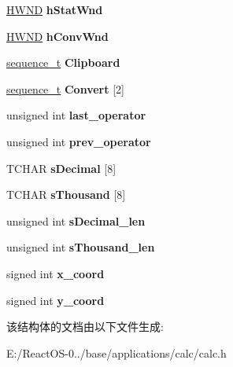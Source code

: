 \begin{DoxyCompactItemize}
\mbox{\label{structcalc__t_ad9746f134105e397276abf40e8cb08a5}} 
\hyperlink{interfacevoid}{H\+W\+ND} {\bfseries h\+Stat\+Wnd}
\item 
\mbox{\label{structcalc__t_aeb227fb85d7af8505466cda7e77a2498}} 
\hyperlink{interfacevoid}{H\+W\+ND} {\bfseries h\+Conv\+Wnd}
\item 
\mbox{\label{structcalc__t_ab4711c702f48f3d140c82bb906680266}} 
\hyperlink{structsequence__t}{sequence\+\_\+t} {\bfseries Clipboard}
\item 
\mbox{\label{structcalc__t_a133a1d537213baa5f1698bf135f0d3a2}} 
\hyperlink{structsequence__t}{sequence\+\_\+t} {\bfseries Convert} \mbox{[}2\mbox{]}
\item 
\mbox{\label{structcalc__t_a5a1b02ddca5ca00d9935b14cf77ff157}} 
unsigned int {\bfseries last\+\_\+operator}
\item 
\mbox{\label{structcalc__t_a3985702d0766d57d33377d9db7ef459f}} 
unsigned int {\bfseries prev\+\_\+operator}
\item 
\mbox{\label{structcalc__t_a9ca8de7ba31c89daf83368544b8bf921}} 
T\+C\+H\+AR {\bfseries s\+Decimal} \mbox{[}8\mbox{]}
\item 
\mbox{\label{structcalc__t_a01728dc06da9deac075084f75db3b15c}} 
T\+C\+H\+AR {\bfseries s\+Thousand} \mbox{[}8\mbox{]}
\item 
\mbox{\label{structcalc__t_adf913e2edf8a38a4d1203be63f1dc785}} 
unsigned int {\bfseries s\+Decimal\+\_\+len}
\item 
\mbox{\label{structcalc__t_a538498866988ecad3b63b28f8673c701}} 
unsigned int {\bfseries s\+Thousand\+\_\+len}
\item 
\mbox{\label{structcalc__t_a96758dff2b47d906cc191d4cfc3ab24e}} 
signed int {\bfseries x\+\_\+coord}
\item 
\mbox{\label{structcalc__t_a27e1c68904e2fc5d82487e90c7bea793}} 
signed int {\bfseries y\+\_\+coord}
\end{DoxyCompactItemize}


该结构体的文档由以下文件生成\+:\begin{DoxyCompactItemize}
\item 
E\+:/\+React\+O\+S-\/0../base/applications/calc/calc.\+h\end{DoxyCompactItemize}
